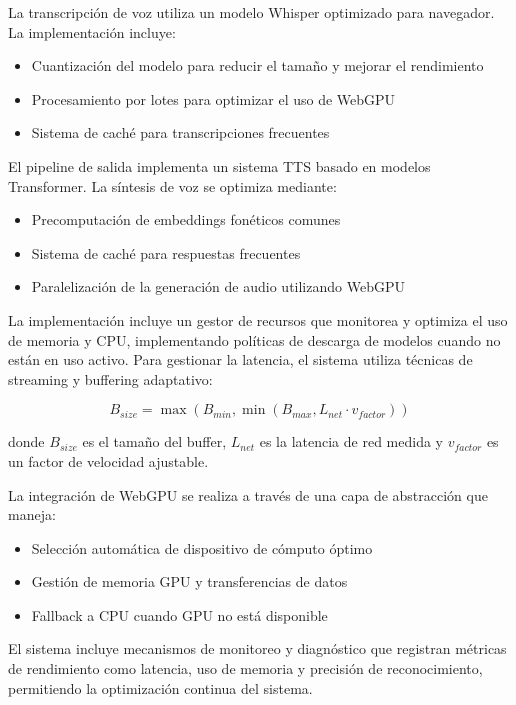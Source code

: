 La transcripción de voz utiliza un modelo Whisper optimizado para navegador. La implementación incluye:

\begin{itemize}
    \item Cuantización del modelo para reducir el tamaño y mejorar el rendimiento
    \item Procesamiento por lotes para optimizar el uso de WebGPU
    \item Sistema de caché para transcripciones frecuentes
\end{itemize}

El pipeline de salida implementa un sistema TTS basado en modelos Transformer. La síntesis de voz se optimiza mediante:

\begin{itemize}
    \item Precomputación de embeddings fonéticos comunes
    \item Sistema de caché para respuestas frecuentes
    \item Paralelización de la generación de audio utilizando WebGPU
\end{itemize}

La implementación incluye un gestor de recursos que monitorea y optimiza el uso de memoria y CPU, implementando políticas de descarga de modelos cuando no están en uso activo. Para gestionar la latencia, el sistema utiliza técnicas de streaming y buffering adaptativo:

\begin{equation}
    B_{size} = \max(B_{min}, \min(B_{max}, L_{net} \cdot v_{factor}))
\end{equation}

donde $B_{size}$ es el tamaño del buffer, $L_{net}$ es la latencia de red medida y $v_{factor}$ es un factor de velocidad ajustable.

La integración de WebGPU se realiza a través de una capa de abstracción que maneja:

\begin{itemize}
    \item Selección automática de dispositivo de cómputo óptimo
    \item Gestión de memoria GPU y transferencias de datos
    \item Fallback a CPU cuando GPU no está disponible
\end{itemize}

El sistema incluye mecanismos de monitoreo y diagnóstico que registran métricas de rendimiento como latencia, uso de memoria y precisión de reconocimiento, permitiendo la optimización continua del sistema.

